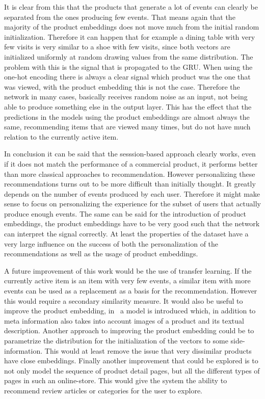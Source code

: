 It is clear from this that the products that generate a lot of events can clearly be separated from the ones producing few events.
That means again that the majority of the product embeddings does not move much from the initial random initialization.
Therefore it can happen that for example a dining table with very few visits is very similar to a shoe with few visits, since both vectors are initialized uniformly at random drawing values from the same distribution.
The problem with this is the signal that is propagated to the GRU.
When using the one-hot encoding there is always a clear signal which product was the one that was viewed, with the product embedding this is not the case.
Therefore the network in many cases, basically receives random noise as an input, not being able to produce something else in the output layer.
This has the effect that the predictions in the models using the product embeddings are almost always the same, recommending items that are viewed many times, but do not have much relation to the currently active item.
\par
In conclusion it can be said that the sesssion-based approach clearly works, even if it does not match the performance of a commercial product, it performs better than more classical approaches to recommendation.
However personalizing these recommendations turns out to be more difficult than initially thought.
It greatly depends on the number of events produced by each user.
Therefore it might make sense to focus on personalizing the experience for the subset of users that actually produce enough events.
The same can be said for the introduction of product embeddings, the product embeddings have to be very good such that the network can interpret the signal correctly.
At least the properties of the dataset have a very large influence on the success of both the personalization of the recommendations as well as the usage of product embeddings.
\par
A future improvement of this work would be the use of transfer learning.
If the currently active item is an item with very few events, a similar item with more events can be used as a replacement as a basis for the recommendation.
However this would require a secondary similarity measure.
It would also be useful to improve the product embedding, in~\cite{content2vec} a model is introduced which, in addition to meta information also takes into account images of a product and its textual description.
Another approach to improving the product embedding could be to parametrize the distribution for the initialization of the vectors to some side-information.
This would at least remove the issue that very dissimilar products have close embeddings.
Finally another improvement that could be explored is to not only model the sequence of product detail pages, but all the different types of pages in such an online-store.
This would give the system the ability to recommend review articles or categories for the user to explore.